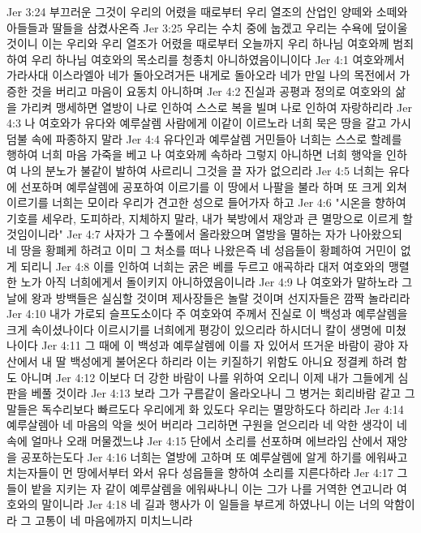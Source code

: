 Jer 3:24  부끄러운 그것이 우리의 어렸을 때로부터 우리 열조의 산업인 양떼와 소떼와 아들들과 딸들을 삼켰사온즉
Jer 3:25  우리는 수치 중에 눕겠고 우리는 수욕에 덮이울 것이니 이는 우리와 우리 열조가 어렸을 때로부터 오늘까지 우리 하나님 여호와께 범죄하여 우리 하나님 여호와의 목소리를 청종치 아니하였음이니이다
Jer 4:1  여호와께서 가라사대 이스라엘아 네가 돌아오려거든 내게로 돌아오라 네가 만일 나의 목전에서 가증한 것을 버리고 마음이 요동치 아니하며
Jer 4:2  진실과 공평과 정의로 여호와의 삶을 가리켜 맹세하면 열방이 나로 인하여 스스로 복을 빌며 나로 인하여 자랑하리라
Jer 4:3  나 여호와가 유다와 예루살렘 사람에게 이같이 이르노라 너희 묵은 땅을 갈고 가시덤불 속에 파종하지 말라
Jer 4:4  유다인과 예루살렘 거민들아 너희는 스스로 할례를 행하여 너희 마음 가죽을 베고 나 여호와께 속하라 그렇지 아니하면 너희 행악을 인하여 나의 분노가 불같이 발하여 사르리니 그것을 끌 자가 없으리라
Jer 4:5  너희는 유다에 선포하며 예루살렘에 공포하여 이르기를 이 땅에서 나팔을 불라 하며 또 크게 외쳐 이르기를 너희는 모이라 우리가 견고한 성으로 들어가자 하고
Jer 4:6  "시온을 향하여 기호를 세우라, 도피하라, 지체하지 말라, 내가 북방에서 재앙과 큰 멸망으로 이르게 할 것임이니라"
Jer 4:7  사자가 그 수풀에서 올라왔으며 열방을 멸하는 자가 나아왔으되 네 땅을 황폐케 하려고 이미 그 처소를 떠나 나왔은즉 네 성읍들이 황폐하여 거민이 없게 되리니
Jer 4:8  이를 인하여 너희는 굵은 베를 두르고 애곡하라 대저 여호와의 맹렬한 노가 아직 너희에게서 돌이키지 아니하였음이니라
Jer 4:9  나 여호와가 말하노라 그 날에 왕과 방백들은 실심할 것이며 제사장들은 놀랄 것이며 선지자들은 깜짝 놀라리라
Jer 4:10  내가 가로되 슬프도소이다 주 여호와여 주께서 진실로 이 백성과 예루살렘을 크게 속이셨나이다 이르시기를 너희에게 평강이 있으리라 하시더니 칼이 생명에 미쳤나이다
Jer 4:11  그 때에 이 백성과 예루살렘에 이를 자 있어서 뜨거운 바람이 광야 자산에서 내 딸 백성에게 불어온다 하리라 이는 키질하기 위함도 아니요 정결케 하려 함도 아니며
Jer 4:12  이보다 더 강한 바람이 나를 위하여 오리니 이제 내가 그들에게 심판을 베풀 것이라
Jer 4:13  보라 그가 구름같이 올라오나니 그 병거는 회리바람 같고 그 말들은 독수리보다 빠르도다 우리에게 화 있도다 우리는 멸망하도다 하리라
Jer 4:14  예루살렘아 네 마음의 악을 씻어 버리라 그리하면 구원을 얻으리라 네 악한 생각이 네 속에 얼마나 오래 머물겠느냐
Jer 4:15  단에서 소리를 선포하며 에브라임 산에서 재앙을 공포하는도다
Jer 4:16  너희는 열방에 고하며 또 예루살렘에 알게 하기를 에워싸고 치는자들이 먼 땅에서부터 와서 유다 성읍들을 향하여 소리를 지른다하라
Jer 4:17  그들이 밭을 지키는 자 같이 예루살렘을 에워싸나니 이는 그가 나를 거역한 연고니라 여호와의 말이니라
Jer 4:18  네 길과 행사가 이 일들을 부르게 하였나니 이는 너의 악함이라 그 고통이 네 마음에까지 미치느니라
